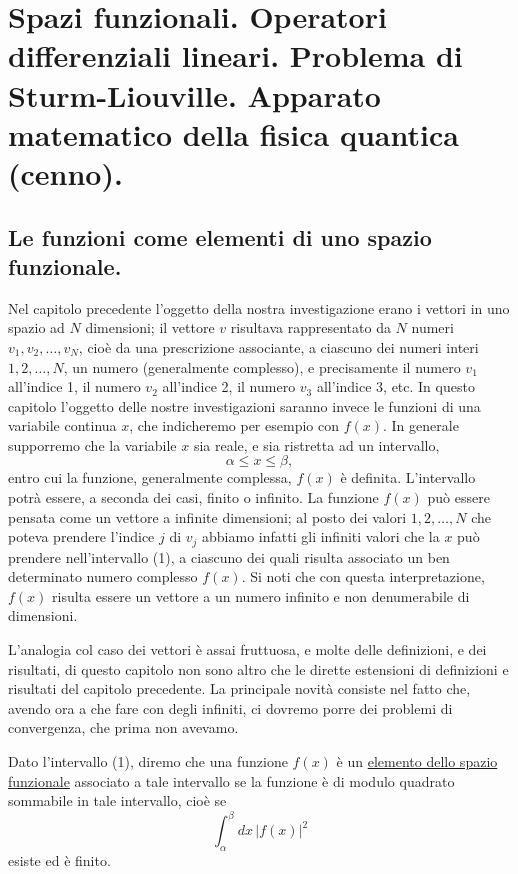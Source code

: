 \documentclass[11pt, a4paper]{book}
\numberwithin{equation}{section}
\begin{document}

\chapter[spazi funzionali, operatori diff. lineari, sturm-liouville]{Spazi funzionali. Operatori differenziali lineari.
Problema di Sturm-Liouville. Apparato matematico della fisica quantica
(cenno).}

\section{Le funzioni come elementi di uno spazio funzionale.}

Nel capitolo precedente l'oggetto della nostra investigazione erano i
vettori in uno spazio ad $N$ dimensioni; il vettore $v$ risultava
rappresentato da $N$ numeri $v_1, v_2, \ldots, v_N$, cioè da una
prescrizione associante, a ciascuno dei numeri interi $1,2,\ldots,N$,
un numero (generalmente complesso), e precisamente il numero $v_1$
all'indice 1, il numero $v_2$ all'indice 2, il numero $v_3$ all'indice
3, etc. In questo capitolo l'oggetto delle nostre investigazioni saranno
invece le funzioni di una variabile continua $x$, che indicheremo per
esempio con $f(x)$. In generale supporremo che la variabile $x$ sia
reale, e sia ristretta ad un intervallo,
\begin{equation}
\alpha \leq x \leq \beta,
\end{equation}
entro cui la funzione, generalmente complessa, $f(x)$ è definita.
L'intervallo potrà essere, a seconda dei casi, finito o infinito. La
funzione $f(x)$ può essere pensata come un vettore a infinite
dimensioni; al posto dei valori $1,2,\ldots,N$ che poteva prendere
l'indice $j$ di $v_j$ abbiamo infatti gli infiniti valori che la $x$
può prendere nell'intervallo (1), a ciascuno dei quali risulta associato
un ben determinato numero complesso $f(x)$. Si noti che con questa
interpretazione, $f(x)$ risulta essere un vettore a un numero infinito e
non denumerabile di dimensioni.

L'analogia col caso dei vettori è assai fruttuosa, e molte delle
definizioni, e dei risultati, di questo capitolo non sono altro che le
dirette estensioni di definizioni e risultati del capitolo precedente.
La principale novità consiste nel fatto che, avendo ora a che fare con
degli infiniti, ci dovremo porre dei problemi di convergenza, che prima
non avevamo.

Dato l'intervallo (1), diremo che una funzione $f(x)$ è un
\underline{elemento dello spazio funzionale} associato a tale intervallo
se la funzione è di modulo quadrato sommabile in tale intervallo, cioè
se
\[
\int_\alpha^\beta dx\,|f(x)|^2
\]
esiste ed è finito.
\end{document}

